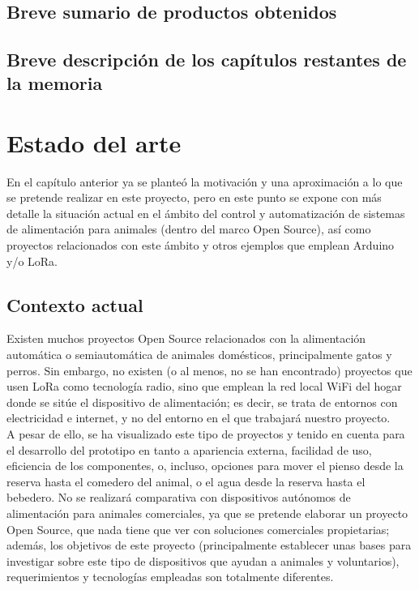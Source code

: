 \documentclass[12pt]{article}
\begin{document}
	 \\
	
	\subsection[Breve sumario de productos obtenidos]{Breve sumario de productos obtenidos}
	\subsection[Breve descripción de los capítulos restantes de la memoria]{Breve descripción de los capítulos restantes de la memoria}
	
	\pagebreak
	

	\section[Estado del arte]{Estado del arte}  
	
	\noindent En el capítulo anterior ya se planteó la motivación y una aproximación a lo que se pretende realizar en este proyecto, pero en este punto se expone con más detalle la situación actual en el ámbito del control y automatización de sistemas de alimentación para animales (dentro del marco Open Source), así como proyectos relacionados con este ámbito y otros ejemplos que emplean Arduino y/o LoRa.
	
	\subsection[Contexto actual]{Contexto actual}
		
	\noindent Existen muchos proyectos Open Source relacionados con la alimentación automática o semiautomática de animales domésticos, principalmente gatos y perros. Sin embargo, no existen (o al menos, no se han encontrado) proyectos que usen LoRa como tecnología radio, sino que emplean la red local WiFi del hogar donde se sitúe el dispositivo de alimentación; es decir, se trata de entornos con electricidad e internet, y no del entorno en el que trabajará nuestro proyecto. \\
	
	\noindent A pesar de ello, se ha visualizado este tipo de proyectos y tenido en cuenta para el desarrollo del prototipo en tanto a apariencia externa, facilidad de uso, eficiencia de los componentes, o, incluso, opciones para mover el pienso desde la reserva hasta el comedero del animal, o el agua desde la reserva hasta el bebedero. No se realizará comparativa con dispositivos autónomos de alimentación para animales comerciales, ya que se pretende elaborar un proyecto Open Source, que nada tiene que ver con soluciones comerciales propietarias; además, los objetivos de este proyecto (principalmente establecer unas bases para investigar sobre este tipo de dispositivos que ayudan a animales y voluntarios), requerimientos y tecnologías empleadas son totalmente diferentes. \\
	
\end{document}
